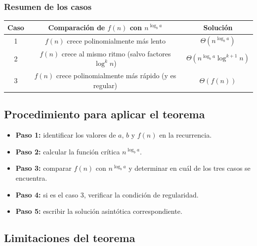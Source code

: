 \documentclass{article}
\begin{document}
        \subsubsection{Resumen de los casos}
        
        \begin{center}
        \renewcommand{\arraystretch}{1.5}
        \begin{tabular}{|c|c|c|}
        \hline
        \textbf{Caso} & \textbf{Comparación de $f(n)$ con $n^{\log_b a}$} & \textbf{Solución} \\
        \hline
        1 & $f(n)$ crece polinomialmente más lento & $\Theta\!\left(n^{\log_b a}\right)$ \\
        \hline
        2 & $f(n)$ crece al mismo ritmo (salvo factores $\log^k n$) & $\Theta\!\left(n^{\log_b a}\log^{k+1} n\right)$ \\
        \hline
        3 & $f(n)$ crece polinomialmente más rápido (y es regular) & $\Theta\!\left(f(n)\right)$ \\
        \hline
        \end{tabular}
        \end{center}
        
        \subsection{Procedimiento para aplicar el teorema}
        
        \begin{itemize}
        \item \textbf{Paso 1:} identificar los valores de $a$, $b$ y $f(n)$ en la
                recurrencia.
        \item \textbf{Paso 2:} calcular la función crítica $n^{\log_b a}$.
        \item \textbf{Paso 3:} comparar $f(n)$ con $n^{\log_b a}$ y determinar en
                cuál de los tres casos se encuentra.
        \item \textbf{Paso 4:} si es el caso 3, verificar la condición de
                regularidad.
        \item \textbf{Paso 5:} escribir la solución asintótica correspondiente.
        \end{itemize}
        
        \subsection{Limitaciones del teorema}
        
\end{document}
